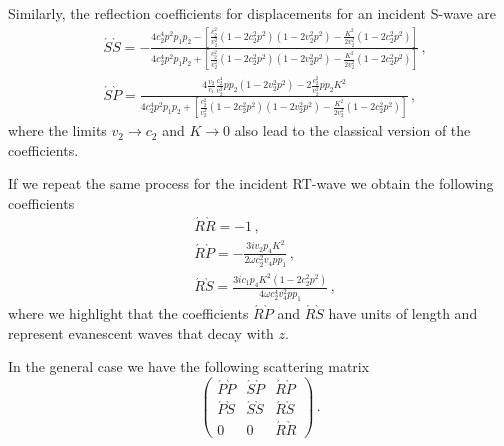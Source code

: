 \documentclass[12pt]{article}
\begin{document}
Similarly, the reflection coefficients for displacements for an incident S-wave are
\begin{align}
&\acute{S}\grave{S} = -\frac{4c_2^4 p^2 p_1 p_2 -  \left[\frac{c_2^2}{v_2^2}(1 - 2c_2^2 p^2)(1 - 2v_2^2 p^2) - \frac{K^2}{2v_2^2}(1 - 2c_2^2 p^2)\right]} {4c_2^4 p^2 p_1 p_2 +  \left[\frac{c_2^2}{v_2^2}(1 - 2c_2^2 p^2)(1 - 2v_2^2 p^2) - \frac{K^2}{2v_2^2}(1 - 2c_2^2 p^2)\right]}\, ,\\
&\acute{S}\grave{P} = \frac{4 \frac{v_2}{c_1}\frac{c_2^4}{v_2^2} p p_2(1 - 2 v_2^2 p^2) -  2 \frac{c_2^2}{v_2^2} p p_2 K^2} {4c_2^4 p^2 p_1 p_2 +  \left[\frac{c_2^2}{v_2^2}(1 - 2c_2^2 p^2)(1 - 2v_2^2 p^2) - \frac{K^2}{2v_2^2}(1 - 2c_2^2 p^2)\right]}\, ,
\end{align}
where the limits \(v_2 \rightarrow c_2\) and \(K \rightarrow 0\) also lead to the classical version of the coefficients.

If we repeat the same process for the incident RT-wave we obtain the following coefficients
\begin{align}
&\acute{R}\grave{R} = -1\, ,\\
&\acute{R}\grave{P} = -\frac{3i v_2 p_4 K^2}{2 \omega c_2^2 v_4 p p_1}\, ,\\
&\acute{R}\grave{S} = \frac{3i c_1 p_4 K^2(1 - 2c_2^2 p^2)}{4 \omega c_2^4 v_4^2 p p_1}\, ,
\end{align}
where we highlight that the coefficients \(\acute{R}\grave{P}\) and \(\acute{R}\grave{S}\) have units of length and represent evanescent waves that decay with \(z\).

In the general case we have the following scattering matrix
\[\begin{pmatrix}
\acute{P}\grave{P} &\acute{S}\grave{P} &\acute{R}\grave{P}\\
\acute{P}\grave{S} &\acute{S}\grave{S} &\acute{R}\grave{S}\\
0 &0 &\acute{R}\grave{R}
\end{pmatrix}\, .\]




\end{document}
